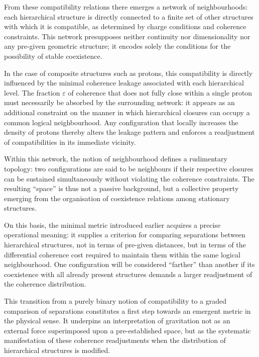 \documentclass[11pt,a4paper]{article}
\begin{document}
From these compatibility relations there emerges a network of neighbourhoods: each hierarchical structure is directly connected to a finite set of other structures with which it is compatible, as determined by charge conditions and coherence constraints. This network presupposes neither continuity nor dimensionality nor any pre-given geometric structure; it encodes solely the conditions for the possibility of stable coexistence.

In the case of composite structures such as protons, this compatibility is directly influenced by the minimal coherence leakage associated with each hierarchical level. The fraction \(\varepsilon\) of coherence that does not fully close within a single proton must necessarily be absorbed by the surrounding network: it appears as an additional constraint on the manner in which hierarchical closures can occupy a common logical neighbourhood. Any configuration that locally increases the density of protons thereby alters the leakage pattern and enforces a readjustment of compatibilities in its immediate vicinity. 

Within this network, the notion of neighbourhood defines a rudimentary topology: two configurations are said to be neighbours if their respective closures can be sustained simultaneously without violating the coherence constraints. The resulting “space” is thus not a passive background, but a collective property emerging from the organisation of coexistence relations among stationary structures. 

On this basis, the minimal metric introduced earlier acquires a precise operational meaning: it supplies a criterion for comparing separations between hierarchical structures, not in terms of pre-given distances, but in terms of the differential coherence cost required to maintain them within the same logical neighbourhood. One configuration will be considered “farther” than another if its coexistence with all already present structures demands a larger readjustment of the coherence distribution. 

This transition from a purely binary notion of compatibility to a graded comparison of separations constitutes a first step towards an emergent metric in the physical sense. It underpins an interpretation of gravitation not as an external force superimposed upon a pre-established space, but as the systematic manifestation of these coherence readjustments when the distribution of hierarchical structures is modified. 
\end{document}
